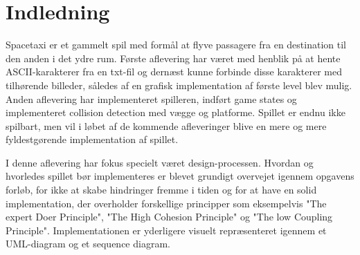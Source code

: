

\section{Indledning}

Spacetaxi er et gammelt spil med formål at flyve passagere fra en destination til den anden i det ydre rum. Første aflevering har været med henblik på at hente ASCII-karakterer fra en txt-fil
og dernæst kunne forbinde disse karakterer med tilhørende billeder, således af en grafisk implementation af første level blev mulig. Anden aflevering har implementeret spilleren, indført game states og implementeret collision detection med vægge og platforme. Spillet er endnu ikke spilbart, men vil i løbet af de kommende afleveringer blive en mere og mere fyldestgørende implementation af spillet.

I denne aflevering har fokus specielt været design-processen. Hvordan og hvorledes spillet bør implementeres er blevet grundigt overvejet igennem opgavens forløb, for ikke at skabe hindringer fremme i tiden og for at have en solid implementation, der overholder forskellige principper som eksempelvis "The expert Doer Principle", "The High Cohesion Principle" og "The low Coupling Principle".
Implementationen er yderligere visuelt repræsenteret igennem et UML-diagram og et sequence diagram.


